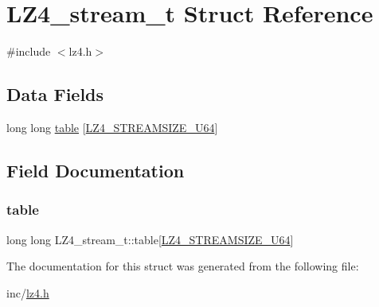 \hypertarget{struct_l_z4__stream__t}{}\section{L\+Z4\+\_\+stream\+\_\+t Struct Reference}
\label{struct_l_z4__stream__t}


{\ttfamily \#include $<$lz4.\+h$>$}

\subsection*{Data Fields}
\begin{DoxyCompactItemize}
\item 
long long \mbox{\hyperlink{struct_l_z4__stream__t_ace4521180b0858afb67f9681394b14b4}{table}} \mbox{[}\mbox{\hyperlink{lz4_8h_acddbce79f3e1d413f295e97d986ab3f5}{L\+Z4\+\_\+\+S\+T\+R\+E\+A\+M\+S\+I\+Z\+E\+\_\+\+U64}}\mbox{]}
\end{DoxyCompactItemize}


\subsection{Field Documentation}
\mbox{\label{struct_l_z4__stream__t_ace4521180b0858afb67f9681394b14b4}} 
\subsubsection{\texorpdfstring{table}{table}}
{\footnotesize\ttfamily long long L\+Z4\+\_\+stream\+\_\+t\+::table\mbox{[}\mbox{\hyperlink{lz4_8h_acddbce79f3e1d413f295e97d986ab3f5}{L\+Z4\+\_\+\+S\+T\+R\+E\+A\+M\+S\+I\+Z\+E\+\_\+\+U64}}\mbox{]}}



The documentation for this struct was generated from the following file\+:\begin{DoxyCompactItemize}
\item 
inc/\mbox{\hyperlink{lz4_8h}{lz4.\+h}}\end{DoxyCompactItemize}
